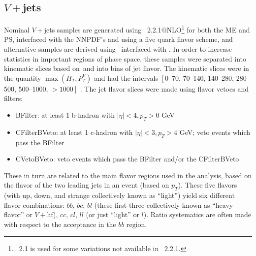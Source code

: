 
\subsection{$V+$jets}
Nominal $V+$jets samples are generated using \sherpa\, 2.2.1@NLO\footnote{\sherpa\, 2.1 is used for some variations not available in \sherpa\, 2.2.1.} \cite{modeling23} for both the ME and PS, interfaced with the NNPDF's and using a five quark flavor scheme, and alternative samples are derived using \mg\, interfaced with .  In order to increase statistics in important regions of phase space, these samples were separated into kinematic slices based on \ptv\,and into bins of jet flavor.  The kinematic slices were in the quantity $\max\left(H_T,P_T^V\right)$ and had the intervals $\left[\right.$0--70, 70--140, 140--280, 280--500, 500--1000, $\left.>1000\right]$ \GeV.  The jet flavor slices were made using flavor vetoes and filters:
\begin{itemize}
\item BFilter: at least 1 b-hadron with $\left|\eta\right|<4, p_T >0$ GeV
\item CFilterBVeto: at least 1 c-hadron with $\left|\eta\right|<3, p_T >4$ GeV; veto events which pass the BFilter
\item CVetoBVeto: veto events which pass the BFilter and/or the CFilterBVeto
\end{itemize}

These in turn are related to the main flavor regions used in the analysis, based on the flavor of the two leading jets in an event (based on $p_T$).  These five flavors (with up, down, and strange collectively known as ``light'') yield six different flavor combinations: $bb$, $bc$, $bl$ (these first three collectively known as ``heavy flavor'' or $V+$hf), $cc$, $cl$, $ll$ (or just ``light'' or $l$).  Ratio systematics are often made with respect to the acceptance in the $bb$ region.

